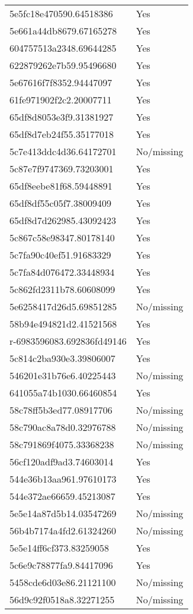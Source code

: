 \begin{tabular}{ll}
5e5fc18e470590.64518386 & Yes \\
5e661a44db8679.67165278 & Yes \\
604757513a2348.69644285 & Yes \\
622879262e7b59.95496680 & Yes \\
5e67616f7f8352.94447097 & Yes \\
61fe971902f2c2.20007711 & Yes \\
65df8d8053e3f9.31381927 & Yes \\
65df8d7eb24f55.35177018 & Yes \\
5c7e413ddc4d36.64172701 & No/missing \\
5c87e7f9747369.73203001 & Yes \\
65df8eebe81f68.59448891 & Yes \\
65df8df55c05f7.38009409 & Yes \\
65df8d7d262985.43092423 & Yes \\
5c867c58e98347.80178140 & Yes \\
5c7fa90c40ef51.91683329 & Yes \\
5c7fa84d076472.33448934 & Yes \\
5c862fd2311b78.60608099 & Yes \\
5e6258417d26d5.69851285 & No/missing \\
58b94e494821d2.41521568 & Yes \\
r-6983596083.692836fd49146 & Yes \\
5c814c2ba930e3.39806007 & Yes \\
546201e31b76e6.40225443 & No/missing \\
641055a74b1030.66460854 & Yes \\
58c78ff5b3ed77.08917706 & No/missing \\
58c790ac8a78d0.32976788 & No/missing \\
58c791869f4075.33368238 & No/missing \\
56cf120adf9ad3.74603014 & Yes \\
544e36b13aa961.97610173 & Yes \\
544e372ae66659.45213087 & Yes \\
5e5e14a87d5b14.03547269 & No/missing \\
56b4b7174a4fd2.61324260 & No/missing \\
5e5e14ff6cf373.83259058 & Yes \\
5c6e9c78877fa9.84417096 & Yes \\
5458cde6d03e86.21121100 & No/missing \\
56d9c92f0518a8.32271255 & No/missing \\

\end{tabular}
